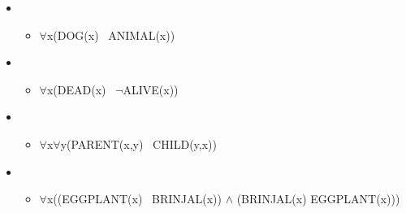 \documentclass[headrule,footrule]{foils}
\begin{document}



\begin{itemize}
\item {}
  \begin{itemize}
  \item $\forall$x(DOG(x) \into\ ANIMAL(x))
  \end{itemize}
\item {}
  \begin{itemize}
  \item $\forall$x(DEAD(x) \into\ $\neg$ALIVE(x))
  \end{itemize}
\item {}
  \begin{itemize}
  \item $\forall$x$\forall$y(PARENT(x,y) \into\ CHILD(y,x))
  \end{itemize}
\item {}
  \begin{itemize}
  \item $\forall$x((EGGPLANT(x) \into\ BRINJAL(x)) $\wedge$ 
    (BRINJAL(x) \into EGGPLANT(x)))
  \end{itemize}
\end{itemize}
\end{document}
